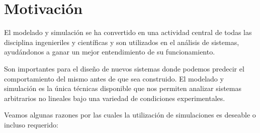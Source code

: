\section{Motivación}
El modelado y simulación\cite{Zeigler} se ha convertido en una actividad central de todas las disciplina ingenieriles y científicas y son utilizados en el análisis de sistemas, ayudándonos a ganar un mejor entendimiento de su funcionamiento. 

Son importantes para el diseño de nuevos sistemas donde podemos predecir el comportamiento del mismo antes de que sea construido.
El modelado y simulación es la única técnicas disponible que nos permiten analizar sistemas arbitrarios no lineales bajo una variedad de condiciones experimentales.

Veamos algunas razones por las cuales la utilización de simulaciones es deseable o incluso requerido:


